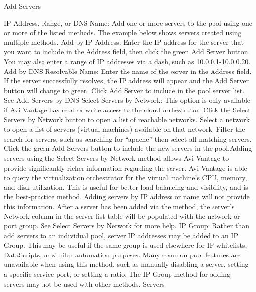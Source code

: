 \documentclass[letterpaper,10pt,english]{sphinxmanual}
\begin{document}
Add Servers

IP Address, Range, or DNS Name: Add one or more servers to the pool using one or more of the listed methods. The example below shows servers created using multiple methods.
Add by IP Address: Enter the IP address for the server that you want to include in the Address field, then click the green Add Server button. You may also enter a range of IP addresses via a dash, such as 10.0.0.1-10.0.0.20.
Add by DNS Resolvable Name: Enter the name of the server in the Address field. If the server successfully resolves, the IP address will appear and the Add Server button will change to green. Click Add Server to include in the pool server list. See Add Servers by DNS
Select Servers by Network: This option is only available if Avi Vantage has read or write access to the cloud orchestrator. Click the Select Servers by Network button to open a list of reachable networks. Select a network to open a list of servers (virtual machines) available on that network. Filter the search for servers, such as searching for ``apache'' then select all matching servers. Click the green Add Servers button to include the new servers in the pool.Adding servers using the Select Servers by Network method allows Avi Vantage to provide significantly richer information regarding the server. Avi Vantage is able to query the virtualization orchestrator for the virtual machine's CPU, memory, and disk utilization. This is useful for better load balancing and visibility, and is the best-practice method. Adding servers by IP address or name will not provide this information. After a server has been added via the method, the server's Network column in the server list table will be populated with the network or port group. See Select Servers by Network for more help.
IP Group: Rather than add servers to an individual pool, server IP addresses may be added to an IP Group. This may be useful if the same group is used elsewhere for IP whitelists, DataScripts, or similar automation purposes. Many common pool features are unavailable when using this method, such as manually disabling a server, setting a specific service port, or setting a ratio. The IP Group method for adding servers may not be used with other methods.
Servers
\end{document}
